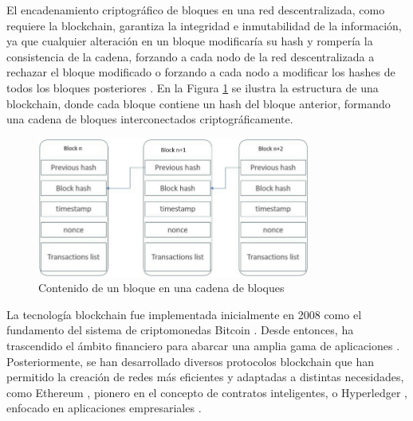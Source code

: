 El encadenamiento criptográfico de bloques en una red descentralizada, como requiere la blockchain, garantiza la integridad e inmutabilidad de la información, ya que cualquier alteración en un bloque modificaría su hash y rompería la consistencia de la cadena, forzando a cada nodo de la red descentralizada a rechazar el bloque modificado o forzando a cada nodo a modificar los hashes de todos los bloques posteriores \cite{sunny2022systematic}. En la Figura \ref{fig:blockchain-structure} se ilustra la estructura de una blockchain, donde cada bloque contiene un hash del bloque anterior, formando una cadena de bloques interconectados criptográficamente.

\begin{figure}[h]
    \centering
    \includegraphics[width=0.8\textwidth]{Figures/blockchain-structure.png}
    \caption{Contenido de un bloque en una cadena de bloques}
    \label{fig:blockchain-structure}
\end{figure}



La tecnología blockchain fue implementada inicialmente en 2008 como el fundamento del sistema de criptomonedas Bitcoin \cite{satoshi2008bitcoin}. Desde entonces, ha trascendido el ámbito financiero para abarcar una amplia gama de aplicaciones \cite{bartolomeo2020introduccion}. Posteriormente, se han desarrollado diversos protocolos blockchain que han permitido la creación de redes más eficientes y adaptadas a distintas necesidades, como Ethereum \cite{buterin2013ethereum}, pionero en el concepto de contratos inteligentes, o Hyperledger \cite{androulaki2018hyperledger}, enfocado en aplicaciones empresariales \cite{sunny2022systematic, rennock2018blockchain}.


